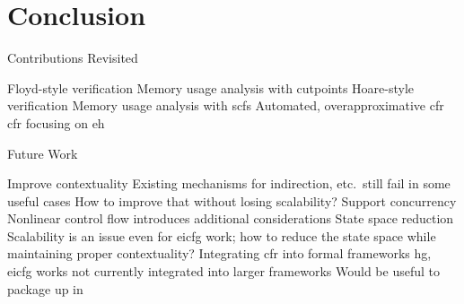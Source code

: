 \section{Conclusion}

\begin{frame}{Contributions Revisited}
  \begin{outline}
    \1 Floyd-style verification
      \2 Memory usage analysis with \alert{cutpoints}
    \1 Hoare-style verification
      \2 Memory usage analysis with \glspl{scf}
    \1 
      \2 Automated, \alert{overapproximative} \gls{cfr}
    \1 
      \2 \Gls{cfr} focusing on \gls{eh}
  \end{outline}
\end{frame}

\begin{frame}{Future Work}
  \begin{outline}
    \1 Improve contextuality
      \2 Existing mechanisms for indirection, etc.\ still fail in some useful cases
      \2 How to improve that without losing scalability?
    \1 Support concurrency
      \2 Nonlinear control flow introduces additional considerations
    \1 State space reduction
      \2 Scalability is an issue even for \gls{eicfg} work; how to reduce the state space while maintaining proper contextuality?
    \1 Integrating \gls{cfr} into formal frameworks
      \2 \Gls{hg}, \gls{eicfg} works not currently integrated into larger frameworks
      \2 Would be useful to package up in 
  \end{outline}
\end{frame}
